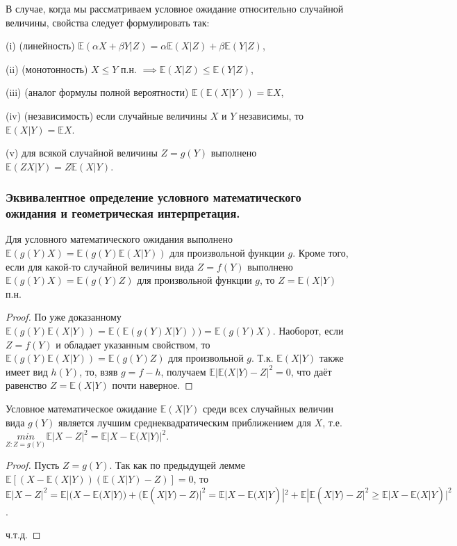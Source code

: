 \begin{theorem}
	В случае, когда мы рассматриваем условное ожидание относительно случайной величины, свойства следует формулировать так:
	
	(i) (линейность) $\mathbb{E}(\alpha X + \beta Y |Z) = \alpha\mathbb{E}(X|Z) + \beta\mathbb{E}(Y | Z)$,
	
	(ii) (монотонность) $X \leqslant Y$ п.н. $\implies \mathbb{E}(X|Z) \leqslant \mathbb{E}(Y|Z)$,
	
	(iii) (аналог формулы полной вероятности) $\mathbb{E}(\mathbb{E}(X|Y)) = \mathbb{E}X$,
	
	(iv) (независимость) если случайные величины $X$ и $Y$ независимы, то $\mathbb{E}(X|Y) = \mathbb{E}X$.
	
	(v) для всякой случайной величины $Z = g(Y)$ выполнено $\mathbb{E}(ZX|Y ) = Z\mathbb{E}(X|Y )$.
\end{theorem}

\subsubsection{Эквивалентное определение условного математического ожидания и геометрическая интерпретация.}

Для условного математического ожидания выполнено $\mathbb{E}(g(Y)X) = \mathbb{E}(g(Y)\mathbb{E}(X|Y))$ для произвольной функции $g$. Кроме того, если для какой-то случайной величины вида $Z = f(Y)$ выполнено $\mathbb{E}(g(Y)X) = \mathbb{E}(g(Y)Z)$ для произвольной функции $g$, то $Z = \mathbb{E}(X|Y)$ п.н.

\begin{proof} По уже доказанному $\mathbb{E}(g(Y)\mathbb{E}(X|Y))= \mathbb{E}(\mathbb{E}(g(Y)X|Y)))=\mathbb{E}(g(Y)X)$. Наоборот, если $Z = f(Y)$ и обладает указанным свойством, то $\mathbb{E}(g(Y)\mathbb{E}(X|Y))=\mathbb{E}(g(Y)Z)$ для произвольной $g$. Т.к. $\mathbb{E}(X|Y)$ также имеет вид $h(Y)$, то, взяв $g = f - h$, получаем $\mathbb{E}|\mathbb{E}(X|Y)-Z|^2 = 0$, что даёт равенство $Z = \mathbb{E}(X|Y)$ почти наверное.
\end{proof}

\begin{proposal}
	Условное математическое ожидание $\mathbb{E}(X|Y)$ среди всех случайных	величин вида $g(Y)$ является лучшим среднеквадратическим приближением для $X$, т.е. $\underset{Z:Z=g(Y )}{min}	\mathbb{E}|X-Z|^2 = \mathbb{E}|X-\mathbb{E}(X|Y)|^2$.
\end{proposal}

\begin{proof}
	Пусть $Z = g(Y)$. Так как по предыдущей лемме $\mathbb{E}[(X - \mathbb{E}(X|Y))(\mathbb{E}(X|Y) - Z)] = 0$, то $\mathbb{E}|X - Z|^2 = \mathbb{E}|(X-\mathbb{E}(X|Y)) + (\mathbb{E}(X|Y)-Z)|^2 = \mathbb{E}|X-\mathbb{E}(X|Y)|^2 + \mathbb{E}|\mathbb{E}(X|Y)-Z|^2 \geqslant \mathbb{E}|X - \mathbb{E}(X|Y)|^2$.
	
	ч.т.д.
\end{proof}

